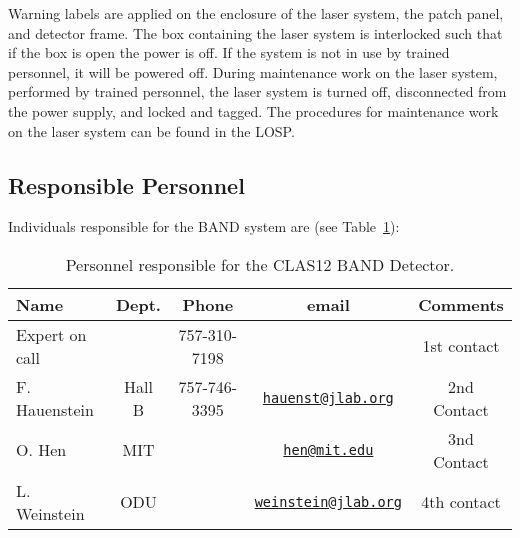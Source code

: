 Warning labels are applied on the enclosure of the laser system, the patch panel, and detector frame. The
box containing the laser system is interlocked such that if the box is open the power is off. If the system
is not in use by trained personnel, it will be powered off. During maintenance work on the laser system,
performed by trained personnel, the laser system is turned off, disconnected from the power supply, and
locked and tagged. The procedures for maintenance work on the laser system can be found in the LOSP.

\subsection{Responsible Personnel}
\indent

Individuals responsible for the BAND system are (see Table~\ref{tb:band}):

\begin{table}[!htb]
 \centering
 \begin{tabular}{|l|c|c|c|c|}
\hline
 Name           & Dept.  & Phone        & email                    & Comments \\ \hline
Expert on call  &        & 757-310-7198 &                          & 1st contact \\ \hline
F. Hauenstein   & Hall B & 757-746-3395 & \href{mailto:hauenst@jlab.org}{\nolinkurl{hauenst@jlab.org}}     & 2nd Contact \\ \hline
O. Hen          & MIT    &              & \href{mailto:hen@mit.edu}{\nolinkurl{hen@mit.edu}}               & 3nd Contact \\ \hline
L. Weinstein    & ODU    &              & \href{mailto:weinstein@jlab.org}{\nolinkurl{weinstein@jlab.org}} & 4th contact  \\ \hline
 \end{tabular}
\caption{Personnel responsible for the CLAS12 BAND Detector.} 
\label{tb:band}
\end{table}
